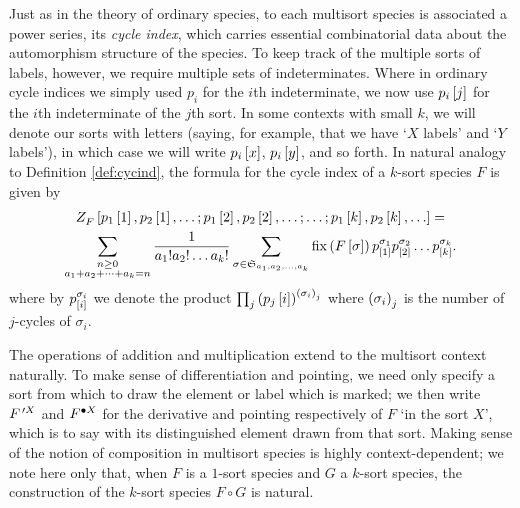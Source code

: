 \documentclass[sectionflow,singlespace,twoside,boldmathhdr,draft]{brandiss} %
\numberwithin{section}{chapter}
\numberwithin{figure}{chapter}
\begin{document}
Just as in the theory of ordinary species, to each multisort species is associated a power series, its \emph{cycle index}, which carries essential combinatorial data about the automorphism structure of the species.
To keep track of the multiple sorts of labels, however, we require multiple sets of indeterminates.
Where in ordinary cycle indices we simply used $p_{i}$ for the $i$th indeterminate, we now use $p_{i} \sbrac{j}$ for the $i$th indeterminate of the $j$th sort.
In some contexts with small $k$, we will denote our sorts with letters (saying, for example, that we have `$X$ labels' and `$Y$ labels'), in which case we will write $p_{i} \sbrac{x}$, $p_{i} \sbrac{y}$, and so forth.
In natural analogy to Definition \ref{def:cycind}, the formula for the cycle index of a $k$-sort species $F$ is given by
\begin{multline}
  \label{eq:multcycinddef}
  \ci{F} \sbrac{p_{1} \sbrac{1}, p_{2} \sbrac{1}, \dots; p_{1} \sbrac{2}, p_{2} \sbrac{2}, \dots; \dots; p_{1} \sbrac{k}, p_{2} \sbrac{k}, \dots} = \\
  \sum_{\substack{n \geq 0 \\ a_{1} + a_{2} + \dots + a_{k} = n}} \frac{1}{a_{1}! a_{2}! \dots a_{k}!} \sum_{\sigma \in \symgp{a_{1}, a_{2}, \dots, a_{k}}} \fix \pbrac{F \sbrac{\sigma}} p^{\sigma_{1}}_{\sbrac{1}} p^{\sigma_{2}}_{\sbrac{2}} \dots p^{\sigma_{k}}_{\sbrac{k}}.
\end{multline}
where by $p^{\sigma_{i}}_{\sbrac{i}}$ we denote the product $\prod_{j} \pbrac{p_{j} \sbrac{i}}^{\pbrac{\sigma_{i}}_{j}}$ where $\pbrac{\sigma_{i}}_{j}$ is the number of $j$-cycles of $\sigma_{i}$.

The operations of addition and multiplication extend to the multisort context naturally.
To make sense of differentiation and pointing, we need only specify a sort from which to draw the element or label which is marked; we then write $\deriv[X]{F}$ and $\pointed[X]{F}$ for the derivative and pointing respectively of $F$ `in the sort $X$', which is to say with its distinguished element drawn from that sort.
Making sense of the notion of composition in multisort species is highly context-dependent; we note here only that, when $F$ is a $1$-sort species and $G$ a $k$-sort species, the construction of the $k$-sort species $F \circ G$ is natural. 
\end{document}
